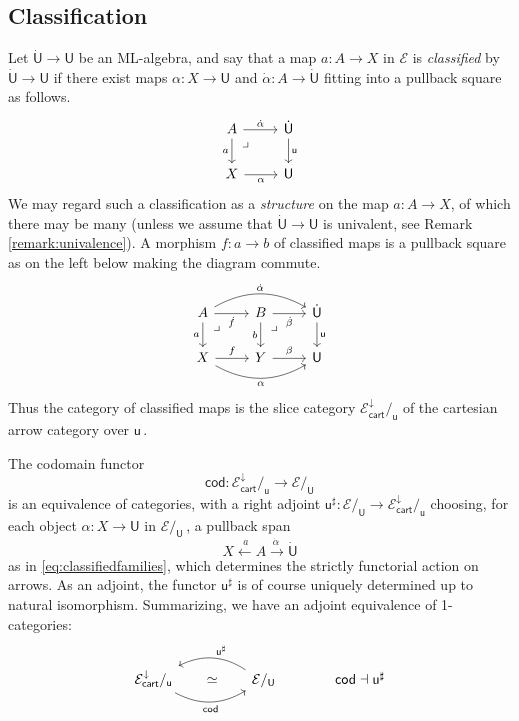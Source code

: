 \documentclass[12pt,reqno]{amsart}
\newcommand{\EE}{\ensuremath{\mathcal{E}}}
\renewcommand{\to}{\ensuremath{\rightarrow}}
\newcommand{\too}{\ensuremath{\longrightarrow}}
\renewcommand{\t}{\ensuremath{\mathsf{u}}}
\newcommand{\T}{\ensuremath{\mathsf{U}}}
\newcommand{\TT}{\ensuremath{\dot{\mathsf{U}}}}
\newcommand{\pbcorner}{\arrow[dr,phantom,"\lrcorner" very near start, shift right=.5ex]} %
\theoremstyle{remark}
\theoremstyle{definition}
\begin{document}
\subsection{Classification}\label{sec:classify}

Let $\TT \to \T$ be an ML-algebra, and say that a map $a : A\to X$ in $\EE$ is \emph{classified} by $\TT \to \T$ if there exist maps $\alpha : X \to \T$ and $\dot{\alpha} : A \to \TT$ fitting into a pullback square as follows.
\begin{equation}\label{eq:classifiedfamilies}
\begin{tikzcd}
	 A \ar[d, swap, "a"] \pbcorner \ar[r, "\dot{\alpha}"] & \TT \ar[d, "\t"] \\  
	X \ar[r, swap, "\alpha"] & \T 
 \end{tikzcd}
 \end{equation}
 We may regard such a classification as a \emph{structure} on the map $a : A\to X$, of which there may be many (unless we assume that $\TT \to \T$ is univalent, see Remark \ref{remark:univalence}).  A morphism $f : a \to b$ of classified maps is a pullback square as on the left below making the diagram commute.
 \begin{equation}\label{eq:classifiedfamilies2}
\begin{tikzcd}
	A \ar[d,swap, "a"] \ar[r,swap, "\dot{f}"]  \ar[rr, bend left, "\dot{\alpha}"]  \pbcorner & B \ar[d,swap, "b"]   \ar[r,swap,  "\dot{\beta}"] \pbcorner & \TT \ar[d, "\t"]  \\  
	X \ar[r, "f"] \ar[rr,swap, bend right, "\alpha"] & Y  \ar[r, "{\beta}"] &  \T
 \end{tikzcd}
 \end{equation}
 Thus the category of classified maps is the slice category $\EE^{\downarrow}_{\mathsf{cart}}/_{\t}$  of the cartesian arrow category over $\t$\,.

The codomain functor
\[
\mathsf{cod} : \EE^{\downarrow}_{\mathsf{cart}}/_{\t} \too \EE/_\T
\]
is an equivalence of categories, with a right adjoint $\t^{\sharp} : \EE/_\T \to \EE^{\downarrow}_{\mathsf{cart}}/_{\t}$ choosing, for each object $\alpha : X \to \T$ in $\EE/_\T$\,, a pullback span $$X \stackrel{\ a}{\leftarrow} A \stackrel{\dot{\alpha}\ }{\to} \TT$$ as in \eqref{eq:classifiedfamilies}, which determines the strictly functorial action on arrows.  As an adjoint, the functor $\t^{\sharp}$ is of course uniquely determined up to natural isomorphism.  Summarizing, we have an adjoint equivalence of 1-categories:
 \begin{equation}\label{eq:slice adjunction}
\begin{tikzcd}
 {\EE^{\downarrow}_{\mathsf{cart}}/_{\t}}  \ar[rr, bend right, swap, "{\mathsf{cod} }"] \ar[rr, phantom, description, "{\simeq}"] && \ar[ll, bend right, swap, "{\t^{\sharp}}"] \EE/_\T & \quad \mathsf{cod} \dashv \t^{\sharp}
 \end{tikzcd}
 \end{equation}
\end{document}
